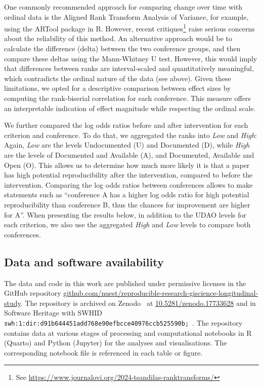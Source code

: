 \documentclass{josis}
\begin{document}
One commonly recommended approach for comparing change over time with ordinal data is the Aligned Rank Transform Analysis of Variance, for example, using the ARTool package in R. 
However, recent critiques\footnote{See \url{https://www.journalovi.org/2024-tsandilas-ranktransforms/}} raise serious concerns about the reliability of this method. 
An alternative approach would be to calculate the difference (delta) between the two conference groups, and then compare these deltas using the Mann-Whitney U test. 
However, this would imply that differences between ranks are interval-scaled and quantitatively meaningful, which contradicts the ordinal nature of the data (see above). 
Given these limitations, we opted for a descriptive comparison between effect sizes by computing the rank-biserial correlation for each conference. 
This measure offers an interpretable indication of effect magnitude while respecting the ordinal scale. 

We further compared the log odds ratios before and after intervention for each criterion and conference. 
To do that, we aggregated the ranks into \textit{Low} and \textit{High}: Again, \textit{Low} are the levels Undocumented (U) and Documented (D), while \textit{High} are the levels of Documented and Available (A), and Documented, Available and Open (O).
This allows us to determine how much more likely it is that a paper has high potential reproducibility after the intervention, compared to before the intervention. 
Comparing the log odds ratios between conferences allows to make statements such as ``conference A has a higher log odds ratio for high potential reproducibility than conference B, thus the chances for improvement are higher for A''.
When presenting the results below, in addition to the UDAO levels for each criterion, we also use the aggregated \textit{High} and \textit{Low} levels to compare both conferences.

\subsection{Data and software availability}
\label{sec:dasa}

The data and code in this work are published under permissive licenses in the GitHub repository \href{https://github.com/nuest/reproducible-research-giscience-longitudinal-study}{github.com/nuest/reproducible-research-giscience-longitudinal-study}.
The repository is archived on Zenodo~\cite{data} at \href{https://doi.org/10.5281/zenodo.17733628}{10.5281/zenodo.17733628} and in Software Heritage with SWHID \texttt{swh:1:dir:d91b644451add768e90efbcce40976ccb525590b;}~\cite{softwareheritage}.
The repository contains data at various stages of processing and computational notebooks in R (Quarto) and Python (Jupyter) for the analyses and visualisations. The corresponding notebook file is referenced in each table or figure.
\end{document}
